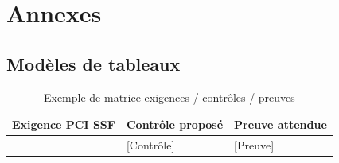 \chapter{Annexes}

\section{Modèles de tableaux}


\begin{table}[h!]
    \centering
    \caption{Exemple de matrice exigences / contrôles / preuves}
    \begin{tabularx}{\textwidth}{p{3cm}X X}
        \toprule
        Exigence PCI SSF & Contrôle proposé & Preuve attendue \\
        \midrule
        [Exigence] & [Contrôle] & [Preuve] \\
        \bottomrule
    \end{tabularx}
\end{table}

